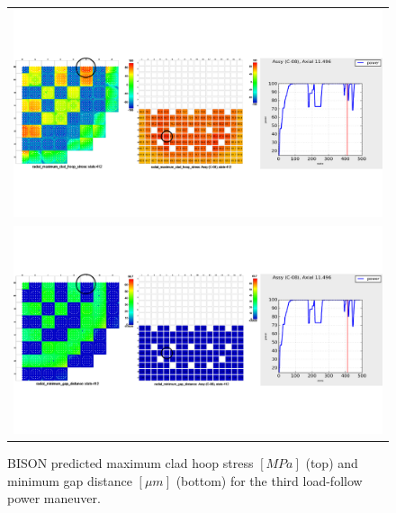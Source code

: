 \documentclass[edeposit,fullpage,11pt]{uiucthesis2009}
\begin{document}
\begin{landscape}
\begin{figure}[h]
\begin{tabular}{c}
\includegraphics[trim={0 4cm 0 4cm},clip,width=\linewidth]{./Figures/bison_res/PR3_MCHS.pdf} \\
\includegraphics[trim={0 4cm 0 4cm},clip,width=\linewidth]{./Figures/bison_res/PR3_MGD.pdf} \\
\end{tabular}
\caption{BISON predicted maximum clad hoop stress $[MPa]$ (top) and minimum gap distance $[ \mu m]$ (bottom) for the third load-follow power maneuver.}
\label{fig:bison_PR3}
\end{figure}
\end{landscape}
\end{document}
